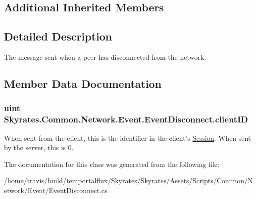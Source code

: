\subsection*{Additional Inherited Members}


\subsection{Detailed Description}
The message sent when a peer has disconnected from the network. 



\subsection{Member Data Documentation}
\hypertarget{class_skyrates_1_1_common_1_1_network_1_1_event_1_1_event_disconnect_a0bfa841aa477f6a472f27fb5ca6d298f}{
\subsubsection[{client\-I\-D}]{\setlength{\rightskip}{0pt plus 5cm}uint Skyrates.\-Common.\-Network.\-Event.\-Event\-Disconnect.\-client\-I\-D}}\label{class_skyrates_1_1_common_1_1_network_1_1_event_1_1_event_disconnect_a0bfa841aa477f6a472f27fb5ca6d298f}


When sent from the client, this is the identifier in the client's \hyperlink{class_skyrates_1_1_common_1_1_network_1_1_session}{Session}. When sent by the server, this is 0. 



The documentation for this class was generated from the following file\-:\begin{DoxyCompactItemize}
\item 
/home/travis/build/temportalflux/\-Skyrates/\-Skyrates/\-Assets/\-Scripts/\-Common/\-Network/\-Event/Event\-Disconnect.\-cs\end{DoxyCompactItemize}
